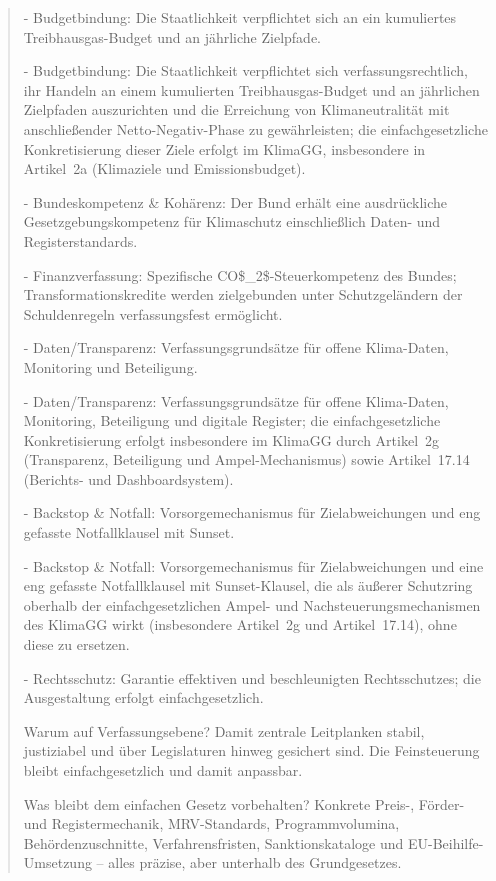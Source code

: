 \documentclass[12pt,a4paper]{scrartcl}
\begin{document}
\begin{quote}
- Budgetbindung: Die Staatlichkeit verpflichtet sich an ein kumuliertes Treibhausgas-Budget und an jährliche Zielpfade.

- Budgetbindung: Die Staatlichkeit verpflichtet sich verfassungsrechtlich, ihr Handeln an einem kumulierten Treibhausgas-Budget und an jährlichen Zielpfaden auszurichten und die Erreichung von Klimaneutralität mit anschließender Netto-Negativ-Phase zu gewährleisten; die einfachgesetzliche Konkretisierung dieser Ziele erfolgt im KlimaGG, insbesondere in Artikel 2a (Klimaziele und Emissionsbudget).

- Bundeskompetenz \& Kohärenz: Der Bund erhält eine ausdrückliche Gesetzgebungskompetenz für Klimaschutz einschließlich Daten- und Registerstandards.

- Finanzverfassung: Spezifische CO\$\_2\$-Steuerkompetenz des Bundes; Transformationskredite werden zielgebunden unter Schutzgeländern der Schuldenregeln verfassungsfest ermöglicht.

- Daten/Transparenz: Verfassungsgrundsätze für offene Klima-Daten, Monitoring und Beteiligung.

- Daten/Transparenz: Verfassungsgrundsätze für offene Klima-Daten, Monitoring, Beteiligung und digitale Register; die einfachgesetzliche Konkretisierung erfolgt insbesondere im KlimaGG durch Artikel 2g (Transparenz, Beteiligung und Ampel-Mechanismus) sowie Artikel 17.14 (Berichts- und Dashboardsystem).

- Backstop \& Notfall: Vorsorgemechanismus für Zielabweichungen und eng gefasste Notfallklausel mit Sunset.

- Backstop \& Notfall: Vorsorgemechanismus für Zielabweichungen und eine eng gefasste Notfallklausel mit Sunset-Klausel, die als äußerer Schutzring oberhalb der einfachgesetzlichen Ampel- und Nachsteuerungsmechanismen des KlimaGG wirkt (insbesondere Artikel 2g und Artikel 17.14), ohne diese zu ersetzen.

- Rechtsschutz: Garantie effektiven und beschleunigten Rechtsschutzes; die Ausgestaltung erfolgt einfachgesetzlich.

Warum auf Verfassungsebene? Damit zentrale Leitplanken stabil, justiziabel und über Legislaturen hinweg gesichert sind. Die Feinsteuerung bleibt einfachgesetzlich und damit anpassbar.

Was bleibt dem einfachen Gesetz vorbehalten? Konkrete Preis-, Förder- und Registermechanik, MRV-Standards, Programmvolumina, Behördenzuschnitte, Verfahrensfristen, Sanktionskataloge und EU-Beihilfe-Umsetzung -- alles präzise, aber unterhalb des Grundgesetzes.


\end{quote}
\end{document}
